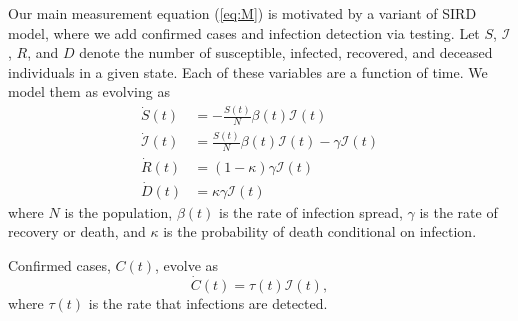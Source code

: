 \documentclass[3p, longtitle]{elsarticle}
\theoremstyle{definition}
\providecommand{\Infected}{{\mathcal{I}}}
\providecommand{\Recovered}{{R}}
\begin{document}
 Our main measurement equation (\ref{eq:M}) is motivated by a variant of SIRD
model, where we add confirmed cases and infection detection via testing.
Let $S$, $\Infected$, $\Recovered$, and $D$ denote the number of susceptible,
infected, recovered, and deceased individuals in a given state. Each of these variables are a function of time. We model
them as evolving as
\begin{align}
  \dot{S}(t) & = -\frac{S(t)}{N} \beta(t) \Infected(t) \label{eq:s} \\
  \dot{\Infected}(t) & = \frac{S(t)}{N} \beta(t) \Infected(t) - \gamma  \Infected(t) \label{eq:i}\\
  \dot{\Recovered}(t) & = (1-\kappa) \gamma  \Infected(t) \label{eq:r}\\ %
  \dot{D}(t) & = \kappa \gamma \Infected(t) %
  \label{eq:d}
\end{align}
where $N$ is the population, $\beta(t)$ is the rate of infection
spread, $\gamma$ is the rate of recovery or death, and $\kappa$ is the
probability of death conditional on infection.

Confirmed cases, $C(t)$, evolve as
\begin{equation}
  \dot{C}(t) = \tau(t) \Infected(t), \label{eq:c}
\end{equation}
where $\tau(t)$ is the rate that infections are detected.
\end{document}

